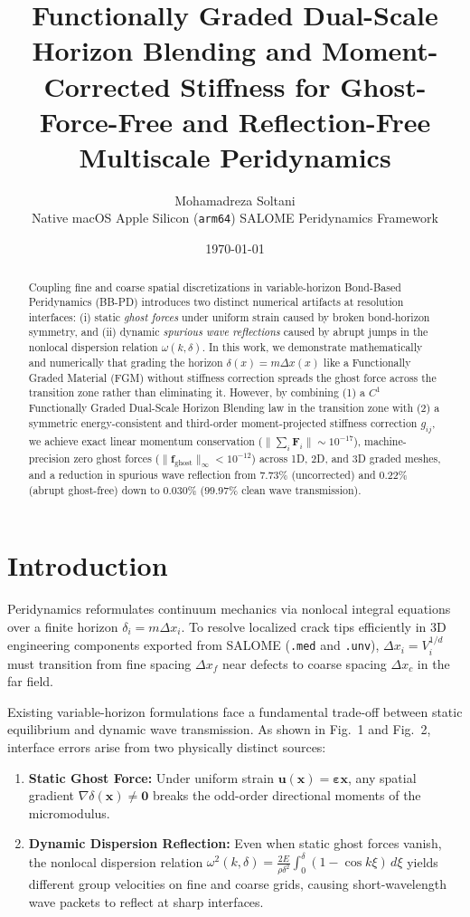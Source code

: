 \documentclass[11pt,a4paper]{article}
\title{\textbf{Functionally Graded Dual-Scale Horizon Blending and Moment-Corrected Stiffness for Ghost-Force-Free and Reflection-Free Multiscale Peridynamics}}
\author{Mohamadreza Soltani \\ \small Native macOS Apple Silicon (\texttt{arm64}) SALOME Peridynamics Framework}
\date{\today}
\begin{document}
\maketitle

\begin{abstract}
Coupling fine and coarse spatial discretizations in variable-horizon Bond-Based Peridynamics (BB-PD) introduces two distinct numerical artifacts at resolution interfaces: (i) static \emph{ghost forces} under uniform strain caused by broken bond-horizon symmetry, and (ii) dynamic \emph{spurious wave reflections} caused by abrupt jumps in the nonlocal dispersion relation $\omega(k,\delta)$. In this work, we demonstrate mathematically and numerically that grading the horizon $\delta(x) = m\Delta x(x)$ like a Functionally Graded Material (FGM) without stiffness correction spreads the ghost force across the transition zone rather than eliminating it. However, by combining (1) a $C^1$ Functionally Graded Dual-Scale Horizon Blending law in the transition zone with (2) a symmetric energy-consistent and third-order moment-projected stiffness correction $g_{ij}$, we achieve exact linear momentum conservation ($\|\sum_i \mathbf{F}_i\| \sim 10^{-17}$), machine-precision zero ghost forces ($\|\mathbf{f}_{\mathrm{ghost}}\|_{\infty} < 10^{-12}$) across 1D, 2D, and 3D graded meshes, and a reduction in spurious wave reflection from $7.73\%$ (uncorrected) and $0.22\%$ (abrupt ghost-free) down to $0.030\%$ ($99.97\%$ clean wave transmission).
\end{abstract}

\section{Introduction}
Peridynamics reformulates continuum mechanics via nonlocal integral equations over a finite horizon $\delta_i = m\Delta x_i$. To resolve localized crack tips efficiently in 3D engineering components exported from SALOME (\texttt{.med} and \texttt{.unv}), $\Delta x_i = V_i^{1/d}$ must transition from fine spacing $\Delta x_f$ near defects to coarse spacing $\Delta x_c$ in the far field.

Existing variable-horizon formulations face a fundamental trade-off between static equilibrium and dynamic wave transmission. As shown in Fig.~1 and Fig.~2, interface errors arise from two physically distinct sources:
\begin{enumerate}
  \item \textbf{Static Ghost Force:} Under uniform strain $\mathbf{u}(\mathbf{x}) = \boldsymbol{\varepsilon}\mathbf{x}$, any spatial gradient $\nabla \delta(\mathbf{x}) \neq \mathbf{0}$ breaks the odd-order directional moments of the micromodulus.
  \item \textbf{Dynamic Dispersion Reflection:} Even when static ghost forces vanish, the nonlocal dispersion relation $\omega^2(k,\delta) = \frac{2E}{\rho\delta^2}\int_0^{\delta}(1-\cos k\xi)\,d\xi$ yields different group velocities on fine and coarse grids, causing short-wavelength wave packets to reflect at sharp interfaces.
\end{enumerate}
\end{document}
